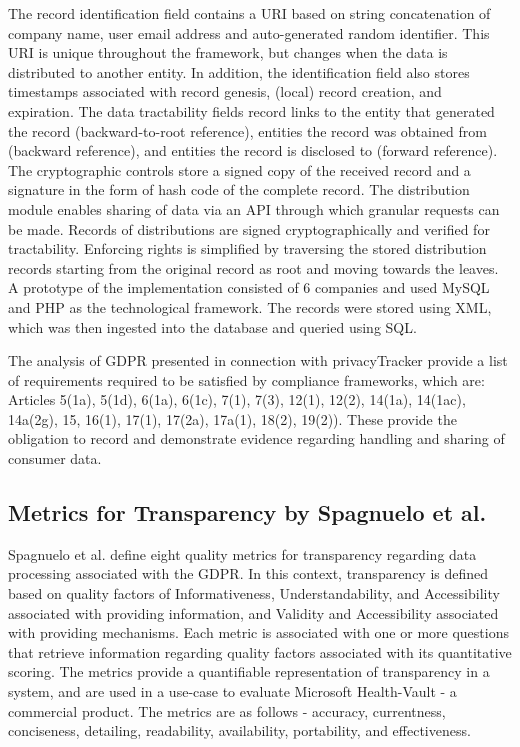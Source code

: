 The record identification field contains a URI based on string concatenation of company name, user email address and auto-generated random identifier. This URI is unique throughout the framework, but changes when the data is distributed to another entity. In addition, the identification field also stores timestamps associated with record genesis, (local) record creation, and expiration. The data tractability fields record links to the entity that generated the record (backward-to-root reference), entities the record was obtained from (backward reference), and entities the record is disclosed to (forward reference). The cryptographic controls store a signed copy of the received record and a signature in the form of hash code of the complete record.
The distribution module enables sharing of data via an API through which granular requests can be made. Records of distributions are signed cryptographically and verified for tractability.
Enforcing rights is simplified by traversing the stored distribution records starting from the original record as root and moving towards the leaves.
A prototype of the implementation consisted of 6 companies and used MySQL and PHP as the technological framework. The records were stored using XML, which was then ingested into the database and queried using SQL.

The analysis of GDPR presented in connection with privacyTracker provide a list of requirements required to be satisfied by compliance frameworks, which are: Articles 5(1a), 5(1d), 6(1a), 6(1c), 7(1), 7(3), 12(1), 12(2), 14(1a), 14(1ac), 14a(2g), 15, 16(1), 17(1), 17(2a), 17a(1), 18(2), 19(2)). These provide the obligation to record and demonstrate evidence regarding handling and sharing of consumer data. 

\subsection{Metrics for Transparency by Spagnuelo et al.}
Spagnuelo et al. \cite{livraga_metrics_2016} define eight quality metrics for transparency regarding data processing associated with the GDPR.
In this context, transparency is defined based on quality factors of Informativeness, Understandability, and Accessibility associated with providing information, and Validity and Accessibility associated with providing mechanisms.
Each metric is associated with one or more questions that retrieve information regarding quality factors associated with its quantitative scoring.
The metrics provide a quantifiable representation of transparency in a system, and are used in a use-case to evaluate Microsoft Health-Vault - a commercial product.
The metrics are as follows - accuracy, currentness, conciseness, detailing, readability, availability, portability, and effectiveness.

